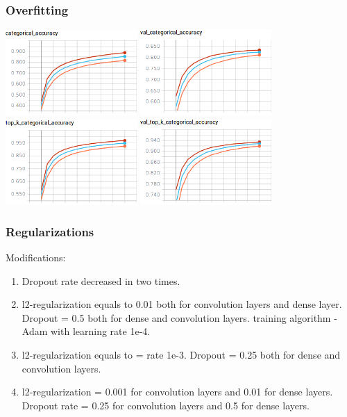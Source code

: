 \documentclass[14pt]{beamer}
\begin{document}
		\begin{frame}
			\frametitle{Overfitting}
			\hfil\hfil\includegraphics[width=5cm]{part4//3CNN_train_category_accuracy}
			\hfil\hfil\includegraphics[width=5cm]{part4//3CNN_val_category_accuracy}\newline
			\vfil
			\hfil\hfil\includegraphics[width=5cm]{part4/3CNN_train_top_k_accuracy}
			\hfil\hfil\includegraphics[width=5cm]{part4/3CNN_val_top_k_accuracy}\newline
		\end{frame}
		
		
	\begin{frame}
		\frametitle{Regularizations}
		Modifications:
		\begin{enumerate}
			\item Dropout rate decreased in two times.
			\item l2-regularization equals to 0.01 both for convolution layers and dense layer. 
			Dropout = 0.5 both for dense and convolution layers. 
		    training algorithm - Adam with learning rate 1e-4. 
			\item l2-regularization equals to = rate 1e-3. 
			Dropout = 0.25 both for dense and convolution layers. 
			\item l2-regularization =  0.001 for convolution layers and 0.01 for dense layers. 
			Dropout rate = 0.25 for convolution layers and 0.5 for dense layers.
		\end{enumerate}
	\end{frame}
			
\end{document}

